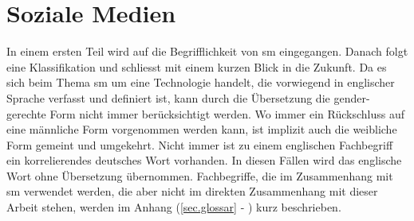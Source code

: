 %
%

\chapter{Soziale Medien}\label{chap.sm}
\glsresetall
In einem ersten Teil wird auf die Begrifflichkeit von \gls{sm} eingegangen. Danach folgt eine Klassifikation und schliesst mit einem kurzen Blick in die Zukunft.\newline
Da es sich beim Thema \gls{sm} um eine Technologie handelt, die vorwiegend in englischer Sprache verfasst und definiert ist, kann durch die Übersetzung die gender-gerechte Form nicht immer berücksichtigt werden. Wo immer ein Rückschluss auf eine männliche Form vorgenommen werden kann, ist implizit auch die weibliche Form gemeint und umgekehrt.  Nicht immer ist zu einem englischen Fachbegriff ein korrelierendes deutsches Wort vorhanden. In diesen Fällen wird das englische Wort ohne Übersetzung übernommen.\newline
Fachbegriffe, die im Zusammenhang mit \gls{sm} verwendet werden, die aber nicht im direkten Zusammenhang mit dieser Arbeit stehen, werden im Anhang (\ref{sec.glossar} - ) kurz beschrieben.
